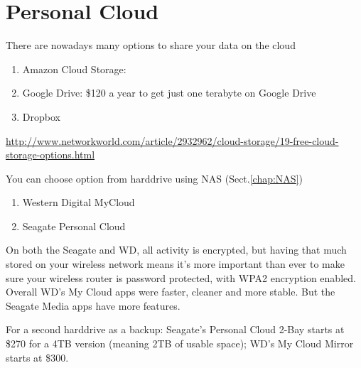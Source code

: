 \chapter{Personal Cloud}

There are nowadays many options to share your data on the cloud
\begin{enumerate}
  \item Amazon Cloud Storage: 
  
  \item  Google Drive:
   \$120 a year to get just one terabyte on Google Drive
  
  \item Dropbox
\end{enumerate}
\url{http://www.networkworld.com/article/2932962/cloud-storage/19-free-cloud-storage-options.html}


You can choose option from harddrive using NAS (Sect.\ref{chap:NAS})
\begin{enumerate}
  \item Western Digital MyCloud
  
  \item Seagate Personal Cloud
\end{enumerate}
On both the Seagate and WD, all activity is encrypted, but having that much
stored on your wireless network means it's more important than ever to make
sure your wireless router is password protected, with WPA2 encryption enabled.
Overall WD's My Cloud apps were faster, cleaner and more stable. But the Seagate
Media apps have more features.

For a second harddrive as a backup: Seagate's Personal Cloud 2-Bay starts at
\$270 for a 4TB version (meaning 2TB of usable space); WD's My Cloud Mirror
starts at \$300.


